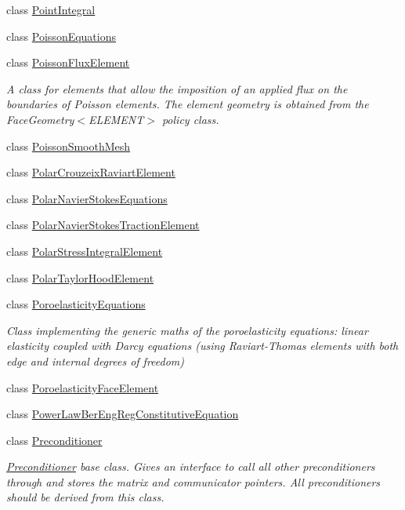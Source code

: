 \begin{DoxyCompactItemize}
class \hyperlink{classoomph_1_1PointIntegral}{Point\+Integral}
\item 
class \hyperlink{classoomph_1_1PoissonEquations}{Poisson\+Equations}
\item 
class \hyperlink{classoomph_1_1PoissonFluxElement}{Poisson\+Flux\+Element}
\begin{DoxyCompactList}\small\item\em A class for elements that allow the imposition of an applied flux on the boundaries of Poisson elements. The element geometry is obtained from the Face\+Geometry$<$\+E\+L\+E\+M\+E\+N\+T$>$ policy class. \end{DoxyCompactList}\item 
class \hyperlink{classoomph_1_1PoissonSmoothMesh}{Poisson\+Smooth\+Mesh}
\item 
class \hyperlink{classoomph_1_1PolarCrouzeixRaviartElement}{Polar\+Crouzeix\+Raviart\+Element}
\item 
class \hyperlink{classoomph_1_1PolarNavierStokesEquations}{Polar\+Navier\+Stokes\+Equations}
\item 
class \hyperlink{classoomph_1_1PolarNavierStokesTractionElement}{Polar\+Navier\+Stokes\+Traction\+Element}
\item 
class \hyperlink{classoomph_1_1PolarStressIntegralElement}{Polar\+Stress\+Integral\+Element}
\item 
class \hyperlink{classoomph_1_1PolarTaylorHoodElement}{Polar\+Taylor\+Hood\+Element}
\item 
class \hyperlink{classoomph_1_1PoroelasticityEquations}{Poroelasticity\+Equations}
\begin{DoxyCompactList}\small\item\em Class implementing the generic maths of the poroelasticity equations\+: linear elasticity coupled with Darcy equations (using Raviart-\/\+Thomas elements with both edge and internal degrees of freedom) \end{DoxyCompactList}\item 
class \hyperlink{classoomph_1_1PoroelasticityFaceElement}{Poroelasticity\+Face\+Element}
\item 
class \hyperlink{classoomph_1_1PowerLawBerEngRegConstitutiveEquation}{Power\+Law\+Ber\+Eng\+Reg\+Constitutive\+Equation}
\item 
class \hyperlink{classoomph_1_1Preconditioner}{Preconditioner}
\begin{DoxyCompactList}\small\item\em \hyperlink{classoomph_1_1Preconditioner}{Preconditioner} base class. Gives an interface to call all other preconditioners through and stores the matrix and communicator pointers. All preconditioners should be derived from this class. \end{DoxyCompactList}\item 

\end{DoxyCompactItemize}
